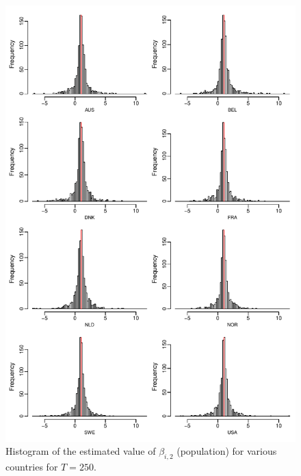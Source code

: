 \documentclass[a4paper,12pt]{article}
\begin{document}
\begin{enumerate}[label=\arabic*.,leftmargin=0.6cm]
{\begin{itemize}[topsep=0pt]
\begin{figure}[p!]
\includegraphics[width=\textwidth]{output/beta_pop_T_250}
\caption{Histogram of the estimated value of $\beta_{i, 2}$ (population) for various countries for $T = 250$.}\label{fig:para:pop:250}
\end{figure}


\end{itemize}}
\end{enumerate}
\end{document}
